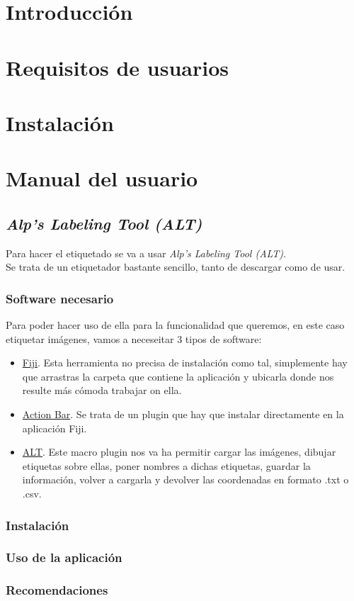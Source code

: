 
\section{Introducción}

\section{Requisitos de usuarios}

\section{Instalación}

\section{Manual del usuario}
\subsection{\textit{Alp’s Labeling Tool (ALT)}}

Para hacer el etiquetado se va a usar \textit{Alp’s Labeling Tool (ALT)}.\\
Se trata de un etiquetador bastante sencillo, tanto de descargar como de usar.\\

\subsubsection{Software necesario}
Para poder hacer uso de ella para la funcionalidad que queremos, en este caso etiquetar imágenes, vamos a neceseitar 3 tipos de software:\\
\begin{itemize}
	\item \href{http://fiji.sc/#download}{Fiji}. Esta herramienta no precisa de instalación como tal, simplemente hay que arrastras la carpeta que contiene la aplicación y ubicarla donde nos resulte más cómoda trabajar on ella.
	\item \href{https://github.com/imagejan/ActionBar/releases/download/SciJava-Parameters/action_bar-2.0.5-SNAPSHOT.jar}{Action Bar}. Se trata de un plugin que hay que instalar directamente en la aplicación Fiji.
	\item \href{https://www.dropbox.com/s/ihkr0ahhif3csvp/ALT_Windows_22mar2017.zip?dl=0}{ALT}. Este macro plugin nos va ha permitir cargar las imágenes, dibujar etiquetas sobre ellas, poner nombres a dichas etiquetas, guardar la información, volver a cargarla y devolver las coordenadas en formato .txt o .csv.
\end{itemize}
\subsubsection{Instalación}

\subsubsection{Uso de la aplicación}
\subsubsection{Recomendaciones}